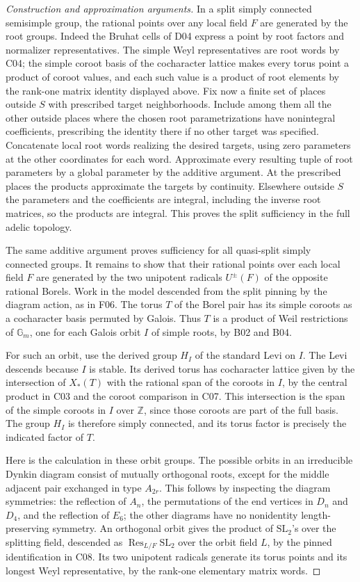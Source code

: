 \documentclass[11pt,a4paper,openany,oneside]{book}
\theoremstyle{resultstyle}
\theoremstyle{definition}
\numberwithin{equation}{chapter}
\newcommand{\Gm}{\mathbb{G}_m}
\newcommand{\SL}{\mathrm{SL}}
\DeclareMathOperator{\Res}{Res}
\newcommand{\ZZ}{\mathbb{Z}}
\begin{document}
\begin{proof}[Construction and approximation arguments]
In a split simply connected semisimple group,
the rational points over any local field $F$
are generated by the root groups. Indeed the
Bruhat cells of D04 express a point by root
factors and normalizer representatives. The
simple Weyl representatives are root words
by C04; the simple coroot basis of the cocharacter
lattice makes every torus point a product of
coroot values, and each such value is a product
of root elements by the rank-one matrix identity
displayed above. Fix now a finite set of places
outside $S$ with prescribed target neighborhoods.
Include among them all the other outside places
where the chosen root parametrizations have
nonintegral coefficients, prescribing the identity
there if no other target was specified. Concatenate
local root words realizing the desired targets,
using zero parameters at the other coordinates
for each word. Approximate every resulting tuple
of root parameters by a global parameter by the
additive argument. At the prescribed places the
products approximate the targets by continuity.
Elsewhere outside $S$ the parameters and the
coefficients are integral, including the inverse
root matrices, so the products are integral.
This proves the split sufficiency in the full
adelic topology.

The same additive argument proves sufficiency for all
quasi-split simply connected groups. It remains to show
that their rational points over each local field \(F\) are
generated by the two unipotent radicals \(U^\pm(F)\) of
the opposite rational Borels. Work in the model descended
from the split pinning by the diagram action, as in F06.
The torus \(T\) of the Borel pair has its simple coroots
as a cocharacter basis permuted by Galois. Thus \(T\) is
a product of Weil restrictions of \(\Gm\), one for each
Galois orbit \(I\) of simple roots, by B02 and B04.

For such an orbit, use the derived group \(H_I\) of the
standard Levi on \(I\). The Levi descends because \(I\)
is stable. Its derived torus has cocharacter lattice
given by the intersection of \(X_*(T)\) with the rational
span of the coroots in \(I\), by the central product in
C03 and the coroot comparison in C07. This intersection
is the span of the simple coroots in \(I\) over \(\ZZ\),
since those coroots are part of the full basis. The group
\(H_I\) is therefore simply connected, and its torus
factor is precisely the indicated factor of \(T\).

Here is the calculation in these orbit groups. The possible
orbits in an irreducible Dynkin diagram consist of
mutually orthogonal roots, except for the middle adjacent
pair exchanged in type \(A_{2r}\). This follows by
inspecting the diagram symmetries: the reflection of
\(A_n\), the permutations of the end vertices in
\(D_n\) and \(D_4\), and the reflection of \(E_6\);
the other diagrams have no nonidentity length-preserving
symmetry. An orthogonal orbit gives the product of
\(\SL_2\)'s over the splitting field, descended as
\(\Res_{L/F}\SL_2\) over the orbit field \(L\), by the
pinned identification in C08. Its two unipotent radicals
generate its torus points and its longest Weyl
representative, by the rank-one elementary matrix words.


\end{proof}
\end{document}

